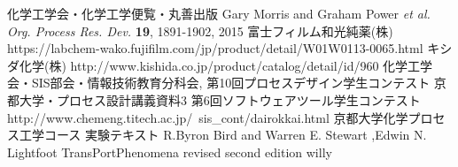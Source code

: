 \documentclass[a4j]{jsreport}
\begin{document}
\newpage
\newpage

\begin{thebibliography}{10}
     化学工学会・化学工学便覧・丸善出版
     Gary Morris and  Graham Power \textit{et al.  Org. Process Res. Dev.} \textbf{19}, 1891-1902, 2015
     富士フィルム和光純薬(株) https://labchem-wako.fujifilm.com/jp/product/detail/W01W0113-0065.html
     キシダ化学(株) http://www.kishida.co.jp/product/catalog/detail/id/960
     化学工学会・SIS部会・情報技術教育分科会, 第10回プロセスデザイン学生コンテスト    
     京都大学・プロセス設計講義資料3
     第6回ソフトウェアツール学生コンテスト http://www.chemeng.titech.ac.jp/~sis_cont/dairokkai.html
     京都大学化学プロセス工学コース 実験テキスト
     R.Byron Bird and Warren E. Stewart ,Edwin N. Lightfoot   TransPortPhenomena revised second edition   willy
\end{thebibliography}

\newpage
\end{document}
